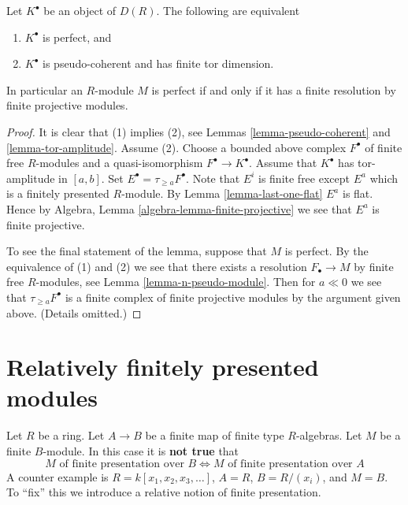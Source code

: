 \begin{lemma}
\label{lemma-perfect}
Let $K^\bullet$ be an object of $D(R)$. The following are equivalent
\begin{enumerate}
\item $K^\bullet$ is perfect, and
\item $K^\bullet$ is pseudo-coherent and has finite tor dimension.
\end{enumerate}
In particular an $R$-module $M$ is perfect if and only if it has a finite
resolution by finite projective modules.
\end{lemma}

\begin{proof}
It is clear that (1) implies (2), see
Lemmas \ref{lemma-pseudo-coherent} and \ref{lemma-tor-amplitude}.
Assume (2). Choose a bounded above complex $F^\bullet$
of finite free $R$-modules and a quasi-isomorphism $F^\bullet \to K^\bullet$.
Assume that $K^\bullet$ has tor-amplitude in $[a, b]$.
Set $E^\bullet = \tau_{\geq a}F^\bullet$. Note that $E^i$ is finite free
except $E^a$ which is a finitely presented $R$-module.
By
Lemma \ref{lemma-last-one-flat}
$E^a$ is flat. Hence by
Algebra, Lemma \ref{algebra-lemma-finite-projective}
we see that $E^a$ is finite projective.

\medskip\noindent
To see the final statement of the lemma, suppose that $M$ is perfect.
By the equivalence of (1) and (2) we see that there exists a resolution
$F_\bullet \to M$ by finite free $R$-modules, see
Lemma \ref{lemma-n-pseudo-module}.
Then for $a \ll 0$ we see that $\tau_{\geq a}F^\bullet$ is
a finite complex of finite projective modules by the argument
given above. (Details omitted.)
\end{proof}









\section{Relatively finitely presented modules}
\label{section-relative-finite-presentation}

\noindent
Let $R$ be a ring. Let $A \to B$ be a finite map of finite type $R$-algebras.
Let $M$ be a finite $B$-module. In this case it is {\bf not true} that
$$
M\text{ of finite presentation over }B
\Leftrightarrow
M\text{ of finite presentation over }A
$$
A counter example is $R = k[x_1, x_2, x_3, \ldots]$, $A = R$, $B = R/(x_i)$,
and $M = B$. To ``fix'' this we introduce a relative notion of finite
presentation.

